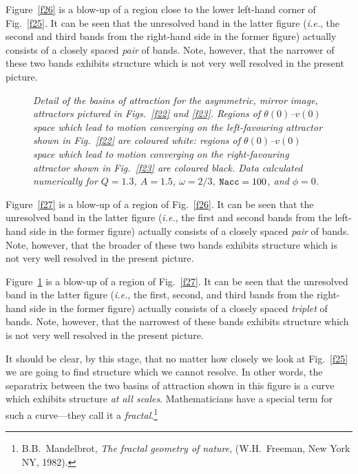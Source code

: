 Figure~\ref{f26} is a blow-up of a region close to the lower left-hand corner of Fig.~\ref{f25}. 
It can be seen that the unresolved band in the latter figure ({\em i.e.}, the second and
third bands from the right-hand side in the former figure) actually consists of a closely spaced 
{\em pair} of bands. 
Note, however, that the narrower of these two bands exhibits structure which is not very well resolved in the
present picture. 


\begin{figure}
\epsfysize=3.75in
\centerline{}
\caption{\em  Detail of the basins of attraction for the asymmetric, mirror image, attractors
pictured in Figs.~\ref{f22} and \ref{f23}. Regions of $\theta(0)$--$v(0)$
space which lead to motion converging on the left-favouring attractor shown
in Fig.~\ref{f22} are coloured white: regions of $\theta(0)$--$v(0)$
space which lead to motion converging on the right-favouring attractor shown
in Fig.~\ref{f23} are coloured black. Data calculated numerically
for $Q=1.3$, $A=1.5$, $\omega=2/3$, ${\tt Nacc} =100$, and $\phi=0$.
}\label{f28}
\end{figure}

Figure~\ref{f27} is a blow-up of a region of Fig.~\ref{f26}. 
It can be seen that the unresolved band in the latter figure ({\em i.e.}, the first and
second bands from the left-hand side in the former figure) actually consists of a closely spaced 
{\em pair} of bands. 
Note, however, that the broader of these two bands exhibits structure which is not very well resolved in the
present picture. 


Figure~\ref{f28} is a blow-up of a region of Fig.~\ref{f27}. 
It can be seen that the unresolved band in the latter figure ({\em i.e.}, the first, second, and third
bands from the right-hand side in the former figure) actually consists of a closely spaced 
{\em triplet} of bands. 
Note, however, that the narrowest of these  bands exhibits structure which is not very well resolved in the
present picture. 

It should be clear, by this stage, that no matter how closely we look at Fig.~\ref{f25} we are
going to find structure which  we cannot resolve. In other words, the separatrix between the two
basins of attraction shown in this figure is a curve which exhibits structure {\em at all
scales}. Mathematicians have a special term for such a curve---they call it a 
{\em fractal}.\footnote{B.B.~Mandelbrot, {\em The fractal geometry of nature}, (W.H.~Freeman, 
New York NY, 1982).}

